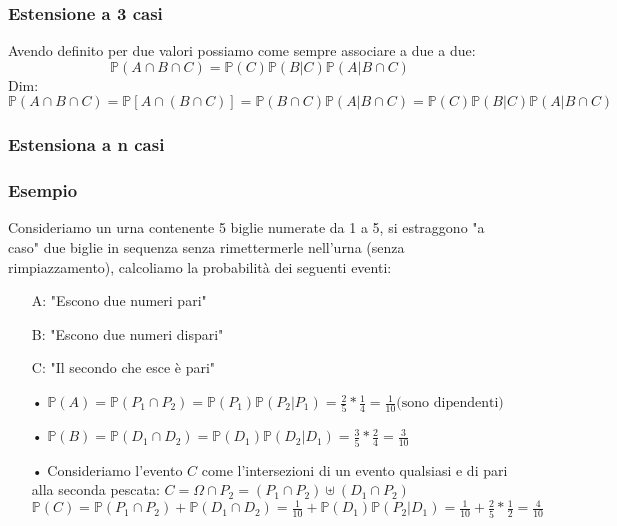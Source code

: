 \subsubsection{Estensione a 3 casi}
Avendo definito per due valori possiamo come sempre associare a due a due:
$$ \mathbb{P}(A \cap B \cap C) = \mathbb{P}(C) \mathbb{P}(B|C) \mathbb{P}(A| B \cap C) $$
Dim:
$$ \mathbb{P}(A \cap B \cap C) = \mathbb{P}[A \cap (B \cap C)] = \mathbb{P}(B \cap C) \mathbb{P}(A| B \cap C) = \mathbb{P}(C) \mathbb{P}(B|C) \mathbb{P}(A| B \cap C) $$
\subsubsection{Estensiona a n casi}

\subsubsection{Esempio}
Consideriamo un urna contenente 5 biglie numerate da 1 a 5, si estraggono "a caso" due biglie in sequenza senza rimettermerle nell'urna (senza rimpiazzamento), calcoliamo la probabilità dei seguenti eventi:
\begin{itemize}
\item[A:]"Escono due numeri pari"
\item[B:]"Escono due numeri dispari"
\item[C:]"Il secondo che esce è pari"
\end{itemize}
\begin{itemize}

\item[•] $\mathbb{P}(A) = \mathbb{P}(P_1 \cap P_2) = \mathbb{P}(P_1)\mathbb{P}(P_2|P_1) = \frac{2}{5}*\frac{1}{4} = \frac{1}{10} \text{(sono dipendenti)}$

\item[•] $ \mathbb{P}(B) = \mathbb{P}(D_1 \cap D_2) = \mathbb{P}(D_1) \mathbb{P}(D_2|D_1) = \frac{3}{5} * \frac{2}{4} = \frac{3}{10}$

\item[•] Consideriamo l'evento $C$ come l'intersezioni di un evento qualsiasi e di pari alla seconda pescata: $C = \Omega \cap P_2 = (P_1 \cap P_2) \uplus (D_1 \cap P_2)$ \\ 
$ \mathbb{P}(C) = \mathbb{P}(P_1 \cap P_2) + \mathbb{P} (D_1 \cap D_2) = \frac{1}{10} + \mathbb{P}(D_1) \mathbb{P}(P_2|D_1) = \frac{1}{10}+\frac{2}{5}*\frac{1}{2} = \frac{4}{10} $
\end{itemize}

